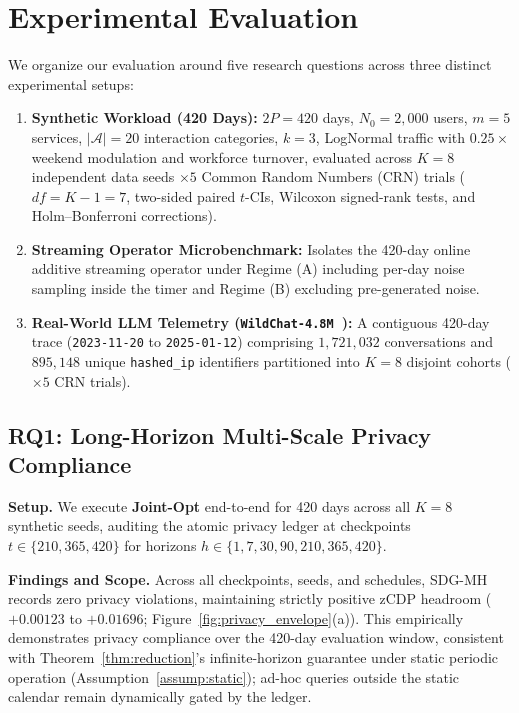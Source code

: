 \documentclass[sigconf, nonacm]{acmart}
\begin{document}
\section{Experimental Evaluation}
\label{sec:exp}

We organize our evaluation around five research questions across three distinct experimental setups:
\begin{enumerate}[leftmargin=*, nosep, topsep=2pt]
    \item \textbf{Synthetic Workload (420 Days):} $2P=420$ days, $N_0=2{,}000$ users, $m=5$ services, $|\mathcal{A}|=20$ interaction categories, $k=3$, LogNormal traffic with $0.25\times$ weekend modulation and workforce turnover, evaluated across $K=8$ independent data seeds $\times 5$ Common Random Numbers (CRN) trials ($df = K-1 = 7$, two-sided paired $t$-CIs, Wilcoxon signed-rank tests, and Holm--Bonferroni corrections).
    \item \textbf{Streaming Operator Microbenchmark:} Isolates the 420-day online additive streaming operator under Regime (A) including per-day noise sampling inside the timer and Regime (B) excluding pre-generated noise.
    \item \textbf{Real-World LLM Telemetry (\texttt{WildChat-4.8M}~\cite{zhao2024wildchat}):} A contiguous 420-day trace (\texttt{2023-11-20} to \texttt{2025-01-12}) comprising $1{,}721{,}032$ conversations and $895{,}148$ unique \texttt{hashed\_ip} identifiers partitioned into $K=8$ disjoint cohorts ($\times 5$ CRN trials).
\end{enumerate}

\subsection{RQ1: Long-Horizon Multi-Scale Privacy Compliance}
\textbf{Setup.} We execute \textbf{Joint-Opt} end-to-end for 420 days across all $K=8$ synthetic seeds, auditing the atomic privacy ledger at checkpoints $t \in \{210, 365, 420\}$ for horizons $h \in \{1, 7, 30, 90, 210, 365, 420\}$.

\textbf{Findings and Scope.} Across all checkpoints, seeds, and schedules, SDG-MH records zero privacy violations, maintaining strictly positive zCDP headroom ($+0.00123$ to $+0.01696$; Figure~\ref{fig:privacy_envelope}(a)). This empirically demonstrates privacy compliance over the 420-day evaluation window, consistent with Theorem~\ref{thm:reduction}'s infinite-horizon guarantee under static periodic operation (Assumption~\ref{assump:static}); ad-hoc queries outside the static calendar remain dynamically gated by the ledger.
\end{document}

